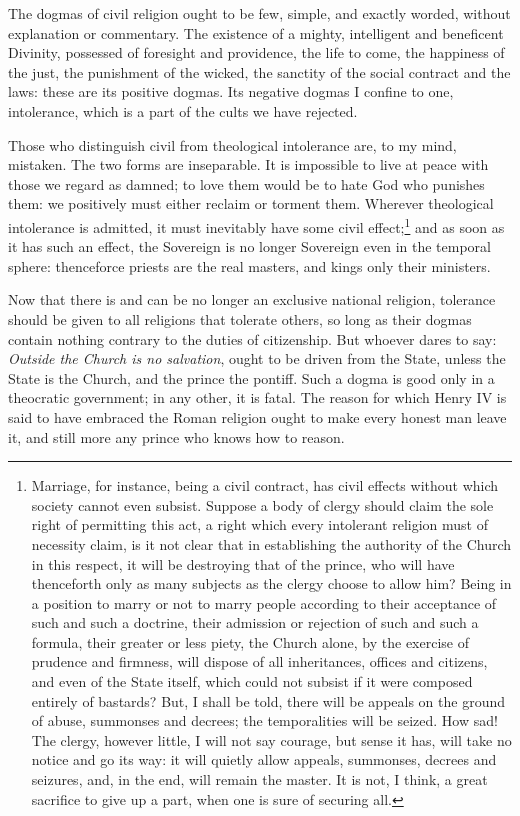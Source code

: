 \documentclass[12pt]{report}
\begin{document}
The dogmas of civil religion ought to be few, simple, and exactly worded, without explanation or commentary. The existence of a mighty, intelligent and beneficent Divinity, possessed of foresight and providence, the life to come, the happiness of the just, the punishment of the wicked, the sanctity of the social contract and the laws: these are its positive dogmas. Its negative dogmas I confine to one, intolerance, which is a part of the cults we have rejected.

Those who distinguish civil from theological intolerance are, to my mind, mistaken. The two forms are inseparable. It is impossible to live at peace with those we regard as damned; to love them would be to hate God who punishes them: we positively must either reclaim or torment them. Wherever theological intolerance is admitted, it must inevitably have some civil effect;\footnote{Marriage, for instance, being a civil contract, has civil effects without which society cannot even subsist. Suppose a body of clergy should claim the sole right of permitting this act, a right which every intolerant religion must of necessity claim, is it not clear that in establishing the authority of the Church in this respect, it will be destroying that of the prince, who will have thenceforth only as many subjects as the clergy choose to allow him? Being in a position to marry or not to marry people according to their acceptance of such and such a doctrine, their admission or rejection of such and such a formula, their greater or less piety, the Church alone, by the exercise of prudence and firmness, will dispose of all inheritances, offices and citizens, and even of the State itself, which could not subsist if it were composed entirely of bastards? But, I shall be told, there will be appeals on the ground of abuse, summonses and decrees; the temporalities will be seized. How sad! The clergy, however little, I will not say courage, but sense it has, will take no notice and go its way: it will quietly allow appeals, summonses, decrees and seizures, and, in the end, will remain the master. It is not, I think, a great sacrifice to give up a part, when one is sure of securing all.} and as soon as it has such an effect, the Sovereign is no longer Sovereign even in the temporal sphere: thenceforce priests are the real masters, and kings only their ministers.

Now that there is and can be no longer an exclusive national religion, tolerance should be given to all religions that tolerate others, so long as their dogmas contain nothing contrary to the duties of citizenship. But whoever dares to say: \textit{Outside the Church is no salvation}, ought to be driven from the State, unless the State is the Church, and the prince the pontiff. Such a dogma is good only in a theocratic government; in any other, it is fatal. The reason for which Henry IV is said to have embraced the Roman religion ought to make every honest man leave it, and still more any prince who knows how to reason.
\end{document}
